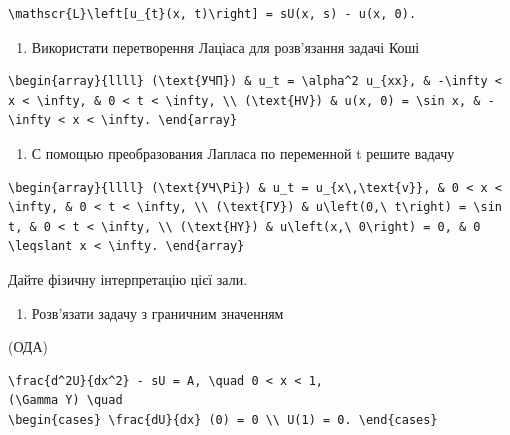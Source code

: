 \documentclass[
  ukrainian,
]{article}
\providecommand{\tightlist}{%
  \setlength{\itemsep}{0pt}\setlength{\parskip}{0pt}}
\begin{document}
\begin{verbatim}
\mathscr{L}\left[u_{t}(x, t)\right] = sU(x, s) - u(x, 0).
\end{verbatim}

\begin{enumerate}
\def\labelenumi{\arabic{enumi}.}
\setcounter{enumi}{1}
\tightlist
\item
  Використати перетворення Лаціаса для розв'язання задачі Коші
\end{enumerate}

\begin{verbatim}
\begin{array}{llll} (\text{УЧП}) & u_t = \alpha^2 u_{xx}, & -\infty < x < \infty, & 0 < t < \infty, \\ (\text{HV}) & u(x, 0) = \sin x, & -\infty < x < \infty. \end{array}
\end{verbatim}

\begin{enumerate}
\def\labelenumi{\arabic{enumi}.}
\setcounter{enumi}{2}
\tightlist
\item
  С помощью преобразования Лапласа по переменной t решите вадачу
\end{enumerate}

\begin{verbatim}
\begin{array}{llll} (\text{УЧ\Pi}) & u_t = u_{x\,\text{v}}, & 0 < x < \infty, & 0 < t < \infty, \\ (\text{ГУ}) & u\left(0,\ t\right) = \sin t, & 0 < t < \infty, \\ (\text{HY}) & u\left(x,\ 0\right) = 0, & 0 \leqslant x < \infty. \end{array}
\end{verbatim}

Дайте фізичну інтерпретацію цієї зали.

\begin{enumerate}
\def\labelenumi{\arabic{enumi}.}
\setcounter{enumi}{3}
\tightlist
\item
  Розв'язати задачу з граничним значенням
\end{enumerate}

(ОДА)

\begin{verbatim}
\frac{d^2U}{dx^2} - sU = A, \quad 0 < x < 1,
(\Gamma Y) \quad
\begin{cases} \frac{dU}{dx} (0) = 0 \\ U(1) = 0. \end{cases}
\end{verbatim}
\end{document}
